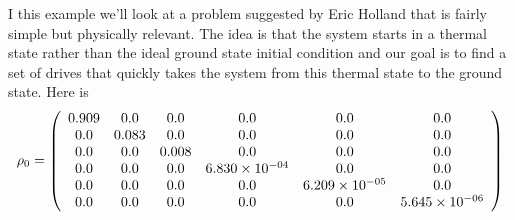 \documentclass{article}
\begin{document}
I this example we'll look at a problem suggested by Eric Holland that is fairly simple but physically relevant.  The idea is that the system starts in a thermal state rather than the ideal ground state initial condition and our goal is to find a set of drives that quickly takes the system from this thermal state to the ground state.   Here is 
\begin{equation*}\rho_0 = \left(\begin{array}{*{11}c}0.909 & 0.0 & 0.0 & 0.0 & 0.0 & 0.0\\0.0 & 0.083 & 0.0 & 0.0 & 0.0 & 0.0\\0.0 & 0.0 & 0.008 & 0.0 & 0.0 & 0.0\\0.0 & 0.0 & 0.0 & 6.830\times10^{-04} & 0.0 & 0.0\\0.0 & 0.0 & 0.0 & 0.0 & 6.209\times10^{-05} & 0.0\\0.0 & 0.0 & 0.0 & 0.0 & 0.0 & 5.645\times10^{-06}\\\end{array}\right)\end{equation*}
\end{document}
